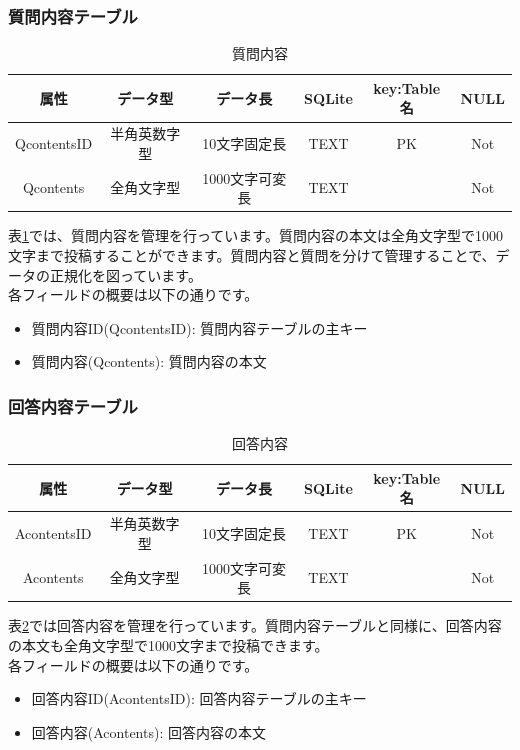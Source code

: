 \documentclass[a4j]{jarticle}
\begin{document}
\subsubsection{質問内容テーブル}
\begin{table}[H]
    \caption{質問内容}
    \label{tbl: qcontents}
    \begin{center}
        \begin{tabular}{|c|c|c|c|c|c|} \hline
           属性 & データ型 & データ長 & SQLite & key:Table名 & NULL\\ \hline \hline
            QcontentsID & 半角英数字型 & 10文字固定長 & TEXT & PK & Not\\ \hline
            Qcontents & 全角文字型 & 1000文字可変長 & TEXT & & Not\\ \hline
        \end{tabular}
    \end{center}
\end{table}
表\ref{tbl: qcontents}では、質問内容を管理を行っています。質問内容の本文は全角文字型で1000文字まで投稿することができます。質問内容と質問を分けて管理することで、データの正規化を図っています。\\
各フィールドの概要は以下の通りです。
\begin{itemize}
  \item 質問内容ID(QcontentsID):
  質問内容テーブルの主キー
  \item 質問内容(Qcontents):
  質問内容の本文
\end{itemize}

\subsubsection{回答内容テーブル}
\begin{table}[H]
    \caption{回答内容}
    \label{tbl: acontents}
    \begin{center}
        \begin{tabular}{|c|c|c|c|c|c|} \hline
            属性 & データ型 & データ長 & SQLite & key:Table名 & NULL\\ \hline \hline
            AcontentsID & 半角英数字型 & 10文字固定長 & TEXT & PK & Not\\ \hline
            Acontents & 全角文字型 & 1000文字可変長 & TEXT & & Not\\ \hline
        \end{tabular}
    \end{center}
\end{table}
表\ref{tbl: acontents}では回答内容を管理を行っています。質問内容テーブルと同様に、回答内容の本文も全角文字型で1000文字まで投稿できます。\\
各フィールドの概要は以下の通りです。
\begin{itemize}
  \item 回答内容ID(AcontentsID):
  回答内容テーブルの主キー
  \item 回答内容(Acontents):
  回答内容の本文
\end{itemize}
\end{document}
